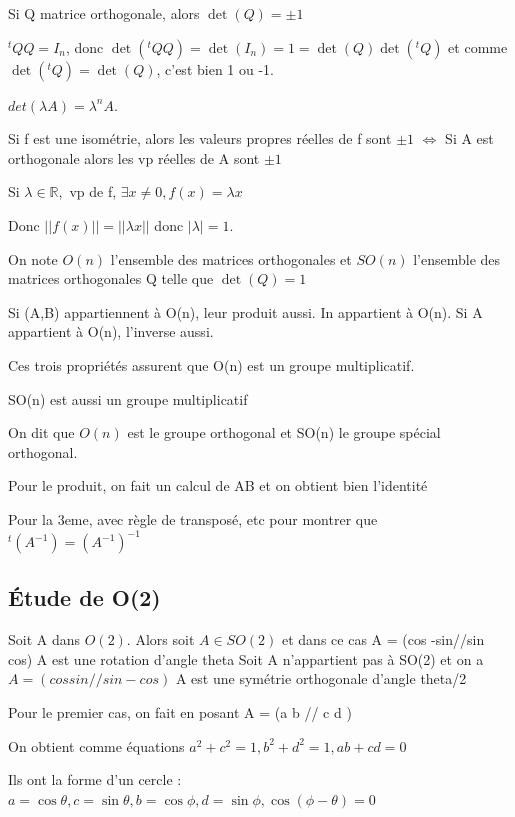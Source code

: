 \documentclass[french]{yLectureNote}
\newcommand{\R}[0]{\mathbb{R}}
\begin{document}
\begin{proposition}
    Si Q matrice orthogonale, alors $\det(Q) = \pm 1$
\end{proposition}
\begin{myproof}
    $^tQQ = I_n$, donc $\det(^tQQ) = \det(I_n) = 1 = \det(Q)\det(^tQ)$ et comme $\det(^tQ) = \det(Q)$, c'est bien 1 ou -1.
\end{myproof}
$det(\lambda A) = \lambda^n A$.
\begin{proposition}
    Si f est une isométrie, alors les valeurs propres réelles de f sont $\pm 1$ $\iff$ Si A est orthogonale alors les vp réelles
    de A sont $\pm 1$
\end{proposition}
\begin{myproof}
    Si $\lambda \in \R,$ vp de f, $\exists x\neq 0, f(x)=\lambda x$

    Donc $||f(x)|| = ||\lambda x||$ donc $|\lambda| = 1$.
\end{myproof}
\begin{definition}
    On note $O(n)$ l'ensemble des matrices orthogonales et $SO(n)$ l'ensemble des matrices
    orthogonales Q telle que $\det(Q) = 1$
\end{definition}
\begin{proposition}
    Si (A,B) appartiennent à O(n), leur produit aussi. In appartient à O(n).
    Si A appartient à O(n), l'inverse aussi.
\end{proposition}
Ces trois propriétés assurent que O(n) est un groupe multiplicatif.
\begin{proposition}
    SO(n) est aussi un groupe multiplicatif
\end{proposition}
On dit que $O(n)$ est le groupe orthogonal et SO(n) le groupe spécial orthogonal.
\begin{myproof}
    Pour le produit, on fait un calcul de AB et on obtient bien l'identité

    Pour la 3eme, avec règle de transposé, etc pour montrer que $^t(A^{-1}) = (A^{-1})^{-1}$
\end{myproof}
\subsection{Étude de O(2)}
\begin{proposition}
    Soit A dans $O(2)$. Alors soit $A\in SO(2)$ et dans ce cas A = (cos -sin//sin cos)
    A est une rotation d'angle theta
    Soit A n'appartient pas à SO(2) et on a $A = (cos sin // sin -cos)$ A est une symétrie orthogonale d'angle theta/2
\end{proposition}
\begin{myproof}
    Pour le premier cas, on fait en posant A = (a b // c d )

    On obtient comme équations $a^2+c^2=1, b^2+d^2=1, ab+cd=0$
    
    Ils ont la forme d'un cercle : $a=\cos \theta, c=\sin\theta, b=\cos\phi, d = \sin \phi, \cos(\phi-\theta)=0$

\end{myproof}
\end{document}

